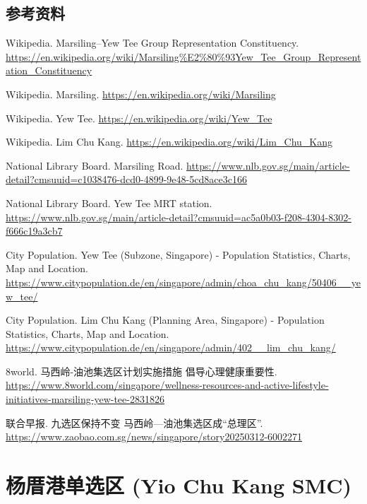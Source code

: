 \documentclass[11pt,a4paper,twoside,openany]{book}
\begin{document}
\section*{参考资料}
\begin{enumerate}[label={[\arabic*]},leftmargin=*,topsep=2pt,itemsep=1pt,parsep=0pt]
  \item Wikipedia. Marsiling–Yew Tee Group Representation Constituency. \url{https://en.wikipedia.org/wiki/Marsiling%E2%80%93Yew_Tee_Group_Representation_Constituency}
  \item Wikipedia. Marsiling. \url{https://en.wikipedia.org/wiki/Marsiling}
  \item Wikipedia. Yew Tee. \url{https://en.wikipedia.org/wiki/Yew_Tee}
  \item Wikipedia. Lim Chu Kang. \url{https://en.wikipedia.org/wiki/Lim_Chu_Kang}
  \item National Library Board. Marsiling Road. \url{https://www.nlb.gov.sg/main/article-detail?cmsuuid=c1038476-dcd0-4899-9e48-5cd8ace3c166}
  \item National Library Board. Yew Tee MRT station. \url{https://www.nlb.gov.sg/main/article-detail?cmsuuid=ac5a0b03-f208-4304-8302-f666c19a3cb7}
  \item City Population. Yew Tee (Subzone, Singapore) - Population Statistics, Charts, Map and Location. \url{https://www.citypopulation.de/en/singapore/admin/choa_chu_kang/50406__yew_tee/}
  \item City Population. Lim Chu Kang (Planning Area, Singapore) - Population Statistics, Charts, Map and Location. \url{https://www.citypopulation.de/en/singapore/admin/402__lim_chu_kang/}
  \item 8world. 马西岭-油池集选区计划实施措施 倡导心理健康重要性. \url{https://www.8world.com/singapore/wellness-resources-and-active-lifestyle-initiatives-marsiling-yew-tee-2831826}
  \item 联合早报. 九选区保持不变 马西岭—油池集选区成“总理区”. \url{https://www.zaobao.com.sg/news/singapore/story20250312-6002271}
\end{enumerate}

\chapter{杨厝港单选区 (Yio Chu Kang SMC)}
\end{document}
